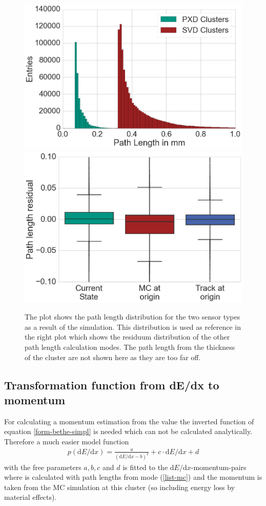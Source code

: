 \begin{figure}
 \centering
 \includegraphics[width=0.47\linewidth]{figures/vxd/pathLengths.png}
 \includegraphics[width=0.47\linewidth]{figures/vxd/box_plot.png}
 \caption[Path length distribution for the two sensor types.]{The plot shows the path length distribution for the two sensor types as a result of the simulation. This distribution is used as reference in the right plot which shows the residuum distribution of the other path length calculation modes. The path length from the thickness of the cluster are not shown here as they are too far off.}
 \label{fig-pathlengths}
\end{figure}

\subsection{Transformation function from dE/dx to momentum} \label{subsection-transform}

For calculating a momentum estimation from the \dedx value the inverted function of equation \ref{form-bethe-simpl} is needed which can not be calculated analytically. Therefore a much easier model function
\begin{align}
 p(\mathrm{d}E/\mathrm{d} x) = \frac{a}{(\mathrm{d}E/\mathrm{d} x - b)^2} + c \cdot \mathrm{d}E/\mathrm{d} x + d \label{form-model}
\end{align}
with the free parameters $a, b, c$ and $d$ is fitted to the $\mathrm d E / \mathrm d x$-momentum-pairs where \dedx is calculated with path lengths from mode (\ref{list-mc}) and the momentum is taken from the MC simulation at this cluster (so including energy loss by material effects).

